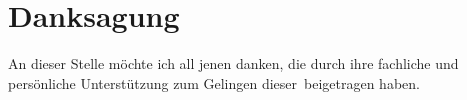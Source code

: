 \vspace*{\fill}
\thispagestyle{empty}
\section*{Danksagung}
An dieser Stelle möchte ich all jenen danken, die durch ihre fachliche und persönliche Unterstützung zum Gelingen dieser \IUBHTexttype\,beigetragen haben.
\vspace*{\fill}
\newpage